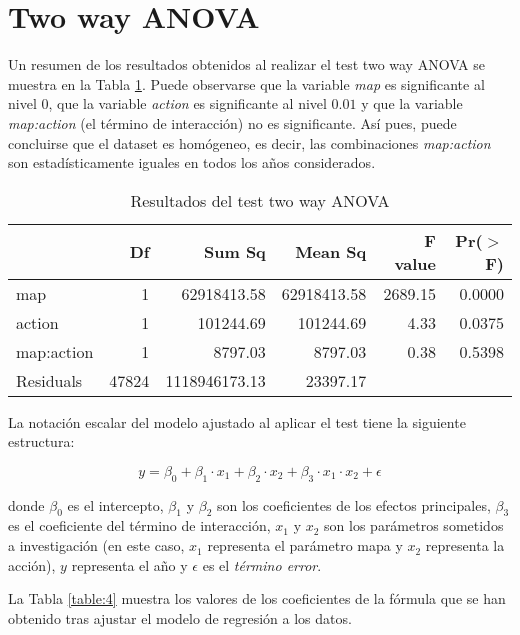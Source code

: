 \documentclass[10pt,a4paper]{article}
\begin{document}
\section{Two way ANOVA}

Un resumen de los resultados obtenidos al realizar el test two way ANOVA se muestra en la Tabla \ref{table:3}. Puede observarse que la variable \emph{map} es significante al nivel $0$, que la variable \emph{action} es significante al nivel $0.01$ y que la variable \emph{map:action} (el término de interacción) no es significante. Así pues, puede concluirse que el dataset es homógeneo, es decir, las combinaciones \emph{map:action} son estadísticamente iguales en todos los años considerados.

\begin{table}[ht]
\centering
\begin{tabular}{lrrrrr}
  \hline
 & Df & Sum Sq & Mean Sq & F value & Pr($>$F) \\ 
  \hline
map         & 1 & 62918413.58 & 62918413.58 & 2689.15 & 0.0000 \\ 
  action      & 1 & 101244.69 & 101244.69 & 4.33 & 0.0375 \\ 
  map:action  & 1 & 8797.03 & 8797.03 & 0.38 & 0.5398 \\ 
  Residuals   & 47824 & 1118946173.13 & 23397.17 &  &  \\ 
   \hline
\end{tabular}
\caption{Resultados del test two way ANOVA}
\label{table:3}
\end{table}

La notación escalar del modelo ajustado al aplicar el test tiene la siguiente estructura:

\begin{equation}
    y = \beta_0 + \beta_1 \cdot x_1 + \beta_2 \cdot x_2 + \beta_3 \cdot x_1 \cdot x_2 + \epsilon
\label{eq1}
\end{equation}

donde $\beta_0$ es el intercepto, $\beta_1$ y $\beta_2$ son los coeficientes de los efectos principales, $\beta_3$ es el coeficiente del término de interacción, $x_1$ y $x_2$ son los parámetros sometidos a investigación (en este caso, $x_1$ representa el parámetro mapa y $x_2$ representa la acción), $y$ representa el año y $\epsilon$ es el \emph{término error}.

La Tabla \ref{table:4} muestra los valores de los coeficientes de la fórmula que se han obtenido tras ajustar el modelo de regresión a los datos.
\end{document}
